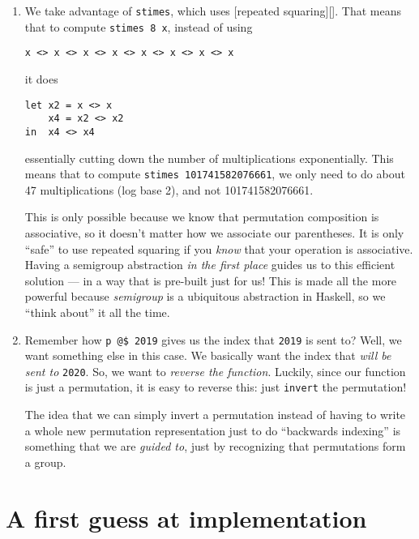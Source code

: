 \documentclass[]{article}
\begin{document}
\begin{enumerate}
\def\labelenumi{\arabic{enumi}.}
\item
  We take advantage of \texttt{stimes}, which uses {[}repeated
  squaring{]}{[}{]}. That means that to compute \texttt{stimes\ 8\ x}, instead
  of using

\begin{verbatim}
x <> x <> x <> x <> x <> x <> x <> x
\end{verbatim}

  it does

\begin{verbatim}
let x2 = x <> x
    x4 = x2 <> x2
in  x4 <> x4
\end{verbatim}

  essentially cutting down the number of multiplications exponentially. This
  means that to compute \texttt{stimes\ 101741582076661}, we only need to do
  about 47 multiplications (log base 2), and not 101741582076661.

  This is only possible because we know that permutation composition is
  associative, so it doesn't matter how we associate our parentheses. It is only
  ``safe'' to use repeated squaring if you \emph{know} that your operation is
  associative. Having a semigroup abstraction \emph{in the first place} guides
  us to this efficient solution --- in a way that is pre-built just for us! This
  is made all the more powerful because \emph{semigroup} is a ubiquitous
  abstraction in Haskell, so we ``think about'' it all the time.
\item
  Remember how \texttt{p\ @\$\ 2019} gives us the index that \texttt{2019} is
  sent to? Well, we want something else in this case. We basically want the
  index that \emph{will be sent to} \texttt{2020}. So, we want to \emph{reverse
  the function}. Luckily, since our function is just a permutation, it is easy
  to reverse this: just \texttt{invert} the permutation!

  The idea that we can simply invert a permutation instead of having to write a
  whole new permutation representation just to do ``backwards indexing'' is
  something that we are \emph{guided to}, just by recognizing that permutations
  form a group.
\end{enumerate}

\hypertarget{a-first-guess-at-implementation}{%
\section{A first guess at
implementation}\label{a-first-guess-at-implementation}}
\end{document}

